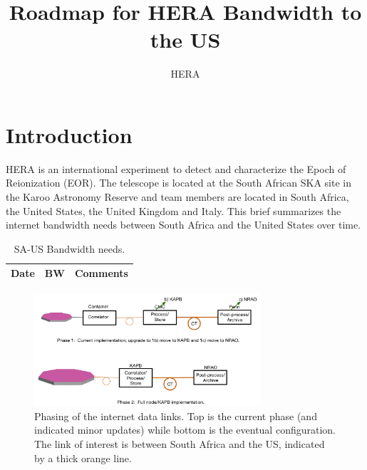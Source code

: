 \documentclass{article}
\begin{document}
\author{HERA}
\title{Roadmap for HERA Bandwidth to the US}
\maketitle

\section{Introduction}
HERA is an international experiment to detect and characterize the Epoch of Reionization (EOR).  The telescope is located at the South African SKA site in the Karoo
Astronomy Reserve and team members are located in South Africa, the United States, the United Kingdom and Italy.  This brief summarizes the internet bandwidth needs
between South Africa and the United States over time.

\begin{table}[H]
\centering
\caption{SA-US Bandwidth needs.}
\begin{tabular}{|l|l|l|}\hline
{\bf Date} & {\bf BW}  & {\bf Comments} \\ \hline
\end{tabular}
\end{table}

\begin{figure}[H]
\includegraphics[width=0.75\textwidth]{bw_planning.png}
\centering
\caption{\small Phasing of the internet data links.  Top is the current phase (and indicated minor updates) while bottom is the eventual configuration.  
The link of interest is between South Africa and the US, indicated by a thick orange line.}
\label{fig:phasing}
\end{figure}
\end{document}
